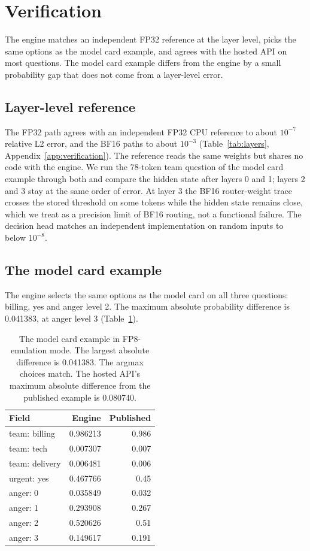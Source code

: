 \documentclass[11pt,a4paper]{article}
\begin{document}
\section{Verification}

The engine matches an independent FP32 reference at the layer level, picks the same options as the model card example, and agrees with the hosted API on most questions. The model card example differs from the engine by a small probability gap that does not come from a layer-level error.

\subsection{Layer-level reference}

The FP32 path agrees with an independent FP32 CPU reference to about $10^{-7}$ relative L2 error, and the BF16 paths to about $10^{-3}$ (Table~\ref{tab:layers}, Appendix~\ref{app:verification}). The reference reads the same weights but shares no code with the engine. We run the 78-token team question of the model card example through both and compare the hidden state after layers 0 and 1; layers 2 and 3 stay at the same order of error. At layer 3 the BF16 router-weight trace crosses the stored threshold on some tokens while the hidden state remains close, which we treat as a precision limit of BF16 routing, not a functional failure. The decision head matches an independent implementation on random inputs to below $10^{-8}$.

\subsection{The model card example}

The engine selects the same options as the model card on all three questions: billing, yes and anger level 2. The maximum absolute probability difference is 0.041383, at anger level 3 (Table~\ref{tab:golden}).

\begin{table}[!htbp]
\centering
\small
\caption{The model card example in FP8-emulation mode. The largest absolute difference is 0.041383. The argmax choices match. The hosted API's maximum absolute difference from the published example is 0.080740.}
\label{tab:golden}
\begin{tabular}{lrr}
\toprule
Field & Engine & Published \\
\midrule
team: billing & 0.986213 & 0.986 \\
team: tech & 0.007307 & 0.007 \\
team: delivery & 0.006481 & 0.006 \\
urgent: yes & 0.467766 & 0.45 \\
anger: 0 & 0.035849 & 0.032 \\
anger: 1 & 0.293908 & 0.267 \\
anger: 2 & 0.520626 & 0.51 \\
anger: 3 & 0.149617 & 0.191 \\
\bottomrule
\end{tabular}
\end{table}
\end{document}
